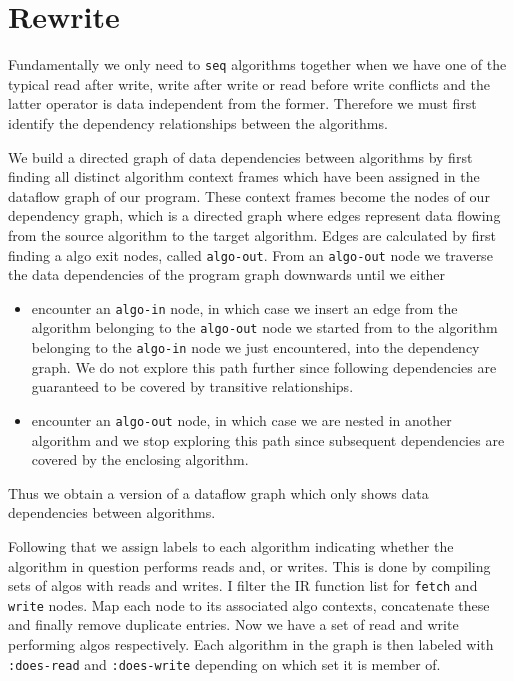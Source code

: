 \section{Rewrite}

Fundamentally we only need to \texttt{seq} algorithms together when we have one of the typical read after write, write after write or read before write conflicts and the latter operator is data independent from the former.
Therefore we must first identify the dependency relationships between the algorithms.

We build a directed graph of data dependencies between algorithms by first finding all distinct algorithm context frames which have been assigned in the dataflow graph of our program.
These context frames become the nodes of our dependency graph, which is a directed graph where edges represent data flowing from the source algorithm to the target algorithm.
Edges are calculated by first finding a algo exit nodes, called \texttt{algo-out}.
From an \texttt{algo-out} node we traverse the data dependencies of the program graph downwards until we either

\begin{itemize}
  \item encounter an \texttt{algo-in} node, in which case we insert an edge from the algorithm belonging to the \texttt{algo-out} node we started from to the algorithm belonging to the \texttt{algo-in} node we just encountered, into the dependency graph.
    We do not explore this path further since following dependencies are guaranteed to be covered by transitive relationships.
  \item encounter an \texttt{algo-out} node, in which case we are nested in another algorithm and we stop exploring this path since subsequent dependencies are covered by the enclosing algorithm.
\end{itemize}

Thus we obtain a version of a dataflow graph which only shows data dependencies between algorithms.

Following that we assign labels to each algorithm indicating whether the algorithm in question performs reads and, or writes.
This is done by compiling sets of algos with reads and writes.
I filter the IR function list for \texttt{fetch} and \texttt{write} nodes.
Map each node to its associated algo contexts, concatenate these and finally remove duplicate entries.
Now we have a set of read and write performing algos respectively.
Each algorithm in the graph is then labeled with \texttt{:does-read} and \texttt{:does-write} depending on which set it is member of.

